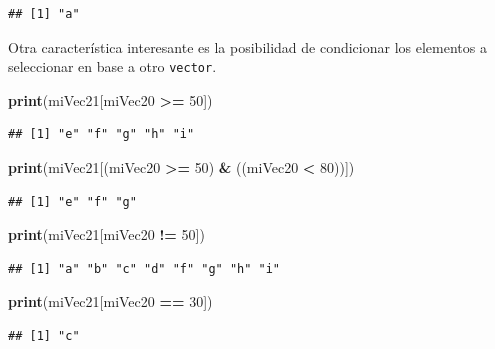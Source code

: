 \documentclass[
]{book}
\newenvironment{Shaded}{\begin{snugshade}}{\end{snugshade}}
\newcommand{\DecValTok}[1]{\textcolor[rgb]{0.00,0.00,0.81}{#1}}
\newcommand{\KeywordTok}[1]{\textcolor[rgb]{0.13,0.29,0.53}{\textbf{#1}}}
\newcommand{\NormalTok}[1]{#1}
\newcommand{\OperatorTok}[1]{\textcolor[rgb]{0.81,0.36,0.00}{\textbf{#1}}}
\newcommand{\StringTok}[1]{\textcolor[rgb]{0.31,0.60,0.02}{#1}}
\begin{document}
\begin{verbatim}
## [1] "a"
\end{verbatim}

Otra característica interesante es la posibilidad de condicionar los elementos a seleccionar en base a otro \texttt{vector}.

\begin{Shaded}
\begin{Highlighting}[]
\KeywordTok{print}\NormalTok{(miVec21[miVec20 }\OperatorTok{>=}\StringTok{ }\DecValTok{50}\NormalTok{])}
\end{Highlighting}
\end{Shaded}

\begin{verbatim}
## [1] "e" "f" "g" "h" "i"
\end{verbatim}

\begin{Shaded}
\begin{Highlighting}[]
\KeywordTok{print}\NormalTok{(miVec21[(miVec20 }\OperatorTok{>=}\StringTok{ }\DecValTok{50}\NormalTok{) }\OperatorTok{&}\StringTok{ }\NormalTok{((miVec20 }\OperatorTok{<}\StringTok{ }\DecValTok{80}\NormalTok{))])}
\end{Highlighting}
\end{Shaded}

\begin{verbatim}
## [1] "e" "f" "g"
\end{verbatim}

\begin{Shaded}
\begin{Highlighting}[]
\KeywordTok{print}\NormalTok{(miVec21[miVec20 }\OperatorTok{!=}\StringTok{ }\DecValTok{50}\NormalTok{])}
\end{Highlighting}
\end{Shaded}

\begin{verbatim}
## [1] "a" "b" "c" "d" "f" "g" "h" "i"
\end{verbatim}

\begin{Shaded}
\begin{Highlighting}[]
\KeywordTok{print}\NormalTok{(miVec21[miVec20 }\OperatorTok{==}\StringTok{ }\DecValTok{30}\NormalTok{])}
\end{Highlighting}
\end{Shaded}

\begin{verbatim}
## [1] "c"
\end{verbatim}
\end{document}

